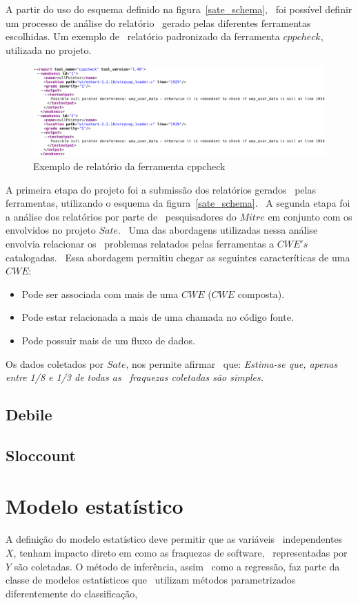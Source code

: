 A partir do uso do esquema definido na figura~\ref{sate_schema}, \ 
foi possível definir um processo de análise do relatório \
gerado pelas diferentes ferramentas escolhidas. Um exemplo de \ 
relatório padronizado da ferramenta $cppcheck$, utilizada no projeto.

\begin{figure}[h]
	\centering
	\label{cppcheck}
        \includegraphics[scale=0.42]{figuras/cppcheck.eps}
	\caption{Exemplo de relatório da ferramenta cppcheck}
\end{figure}
\newpage

A primeira etapa do projeto foi a submissão dos relatórios gerados \ 
pelas ferramentas, utilizando o esquema da figura~\ref{sate_schema}. \ 
A segunda etapa foi a análise dos relatórios por parte de \ 
pesquisadores do $Mitre$ em conjunto com os envolvidos no projeto $Sate$. \ 
Uma das abordagens utilizadas nessa análise envolvia relacionar os \ 
problemas relatados pelas ferramentas a $CWE's$ catalogadas. \ 
Essa abordagem permitiu chegar as seguintes caracteríticas de uma $CWE$:

\begin{itemize}
        \item Pode ser associada com mais de uma $CWE$ ($CWE$ composta).
        \item Pode estar relacionada a mais de uma chamada no código fonte.
        \item Pode possuir mais de um fluxo de dados.
\end{itemize}

Os dados coletados por $Sate$, nos permite afirmar \ 
que: \emph{Estima-se que, apenas entre 1/8 e 1/3  de todas as \ 
fraquezas coletadas são simples.}

\subsection{Debile}

\subsection{Sloccount}


\section{Modelo estatístico}

A definição do modelo estatístico deve permitir que as variáveis \ 
independentes $X$, tenham impacto direto em como as fraquezas de software, \ 
representadas por $Y$ são coletadas. O método de inferência, assim \ 
como a regressão, faz parte da classe de modelos estatísticos que \ 
utilizam métodos parametrizados diferentemente do classificação, 
